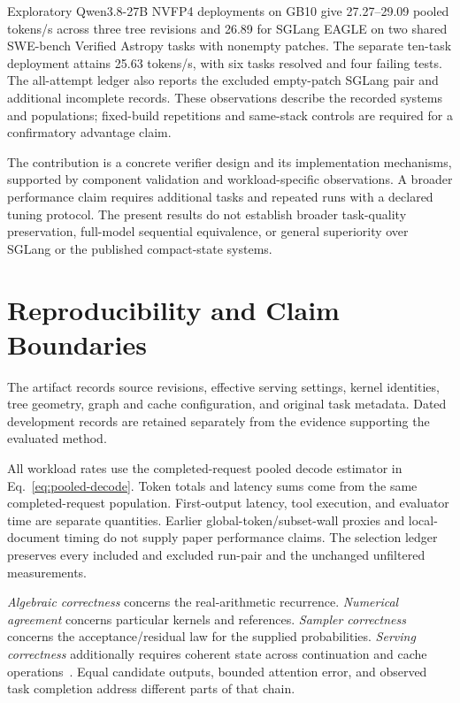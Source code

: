 \documentclass[conference]{IEEEtran}
\begin{document}
Exploratory Qwen3.8-27B NVFP4 deployments on GB10 give 27.27--29.09 pooled tokens/s across three tree revisions and 26.89 for SGLang EAGLE on two shared SWE-bench Verified Astropy tasks with nonempty patches. The separate ten-task deployment attains 25.63 tokens/s, with six tasks resolved and four failing tests. The all-attempt ledger also reports the excluded empty-patch SGLang pair and additional incomplete records. These observations describe the recorded systems and populations; fixed-build repetitions and same-stack controls are required for a confirmatory advantage claim.

The contribution is a concrete verifier design and its implementation mechanisms, supported by component validation and workload-specific observations. A broader performance claim requires additional tasks and repeated runs with a declared tuning protocol. The present results do not establish broader task-quality preservation, full-model sequential equivalence, or general superiority over SGLang or the published compact-state systems.

\appendices
\section{Reproducibility and Claim Boundaries}
\label{app:audit}
The artifact records source revisions, effective serving settings, kernel identities, tree geometry, graph and cache configuration, and original task metadata. Dated development records are retained separately from the evidence supporting the evaluated method.

All workload rates use the completed-request pooled decode estimator in Eq.~\ref{eq:pooled-decode}. Token totals and latency sums come from the same completed-request population. First-output latency, tool execution, and evaluator time are separate quantities. Earlier global-token/subset-wall proxies and local-document timing do not supply paper performance claims. The selection ledger preserves every included and excluded run-pair and the unchanged unfiltered measurements.

\textit{Algebraic correctness} concerns the real-arithmetic recurrence. \textit{Numerical agreement} concerns particular kernels and references. \textit{Sampler correctness} concerns the acceptance/residual law for the supplied probabilities. \textit{Serving correctness} additionally requires coherent state across continuation and cache operations~\cite{yang2024delta,chen2023sampling,lumo2026archive}. Equal candidate outputs, bounded attention error, and observed task completion address different parts of that chain.
\end{document}
